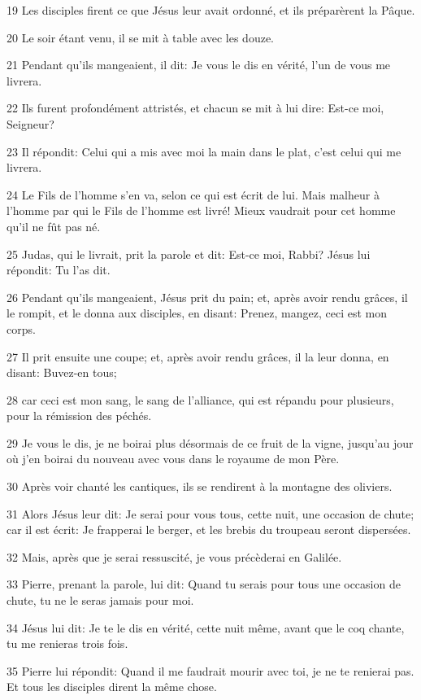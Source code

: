 \par 19 Les disciples firent ce que Jésus leur avait ordonné, et ils préparèrent la Pâque.
\par 20 Le soir étant venu, il se mit à table avec les douze.
\par 21 Pendant qu'ils mangeaient, il dit: Je vous le dis en vérité, l'un de vous me livrera.
\par 22 Ils furent profondément attristés, et chacun se mit à lui dire: Est-ce moi, Seigneur?
\par 23 Il répondit: Celui qui a mis avec moi la main dans le plat, c'est celui qui me livrera.
\par 24 Le Fils de l'homme s'en va, selon ce qui est écrit de lui. Mais malheur à l'homme par qui le Fils de l'homme est livré! Mieux vaudrait pour cet homme qu'il ne fût pas né.
\par 25 Judas, qui le livrait, prit la parole et dit: Est-ce moi, Rabbi? Jésus lui répondit: Tu l'as dit.
\par 26 Pendant qu'ils mangeaient, Jésus prit du pain; et, après avoir rendu grâces, il le rompit, et le donna aux disciples, en disant: Prenez, mangez, ceci est mon corps.
\par 27 Il prit ensuite une coupe; et, après avoir rendu grâces, il la leur donna, en disant: Buvez-en tous;
\par 28 car ceci est mon sang, le sang de l'alliance, qui est répandu pour plusieurs, pour la rémission des péchés.
\par 29 Je vous le dis, je ne boirai plus désormais de ce fruit de la vigne, jusqu'au jour où j'en boirai du nouveau avec vous dans le royaume de mon Père.
\par 30 Après voir chanté les cantiques, ils se rendirent à la montagne des oliviers.
\par 31 Alors Jésus leur dit: Je serai pour vous tous, cette nuit, une occasion de chute; car il est écrit: Je frapperai le berger, et les brebis du troupeau seront dispersées.
\par 32 Mais, après que je serai ressuscité, je vous précèderai en Galilée.
\par 33 Pierre, prenant la parole, lui dit: Quand tu serais pour tous une occasion de chute, tu ne le seras jamais pour moi.
\par 34 Jésus lui dit: Je te le dis en vérité, cette nuit même, avant que le coq chante, tu me renieras trois fois.
\par 35 Pierre lui répondit: Quand il me faudrait mourir avec toi, je ne te renierai pas. Et tous les disciples dirent la même chose.

